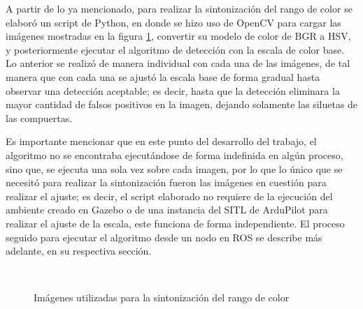 A partir de lo ya mencionado, para realizar la sintonización del rango de color se elaboró un script de Python, en donde se hizo uso de OpenCV para cargar las imágenes mostradas en la figura \ref{fig:cv_gates}, convertir su modelo de color de BGR a HSV, y posteriormente ejecutar el algoritmo de detección con la escala de color base. Lo anterior se realizó de manera individual con cada una de las imágenes, de tal manera que con cada una se ajustó la escala base de forma gradual hasta observar una detección aceptable; es decir, hasta que la detección eliminara la mayor cantidad de falsos positivos en la imagen, dejando solamente las siluetas de las compuertas. 

Es importante mencionar que en este punto del desarrollo del trabajo, el algoritmo no se encontraba ejecutándose de forma indefinida en algún proceso, sino que, se ejecuta una sola vez sobre cada imagen, por lo que lo único que se necesitó para realizar la sintonización fueron las imágenes en cuestión para realizar el ajuste; es decir, el script elaborado no requiere de la ejecución del ambiente creado en Gazebo o de una instancia del SITL de ArduPilot para realizar el ajuste de la escala, este funciona de forma independiente. El proceso seguido para ejecutar el algoritmo desde un nodo en ROS se describe más adelante, en su respectiva sección.


\begin{figure}[ht]
    \centering
    \hfill
    \\
    \hfill
    \hfill

    \caption{Imágenes utilizadas para la sintonización del rango de color}
    \label{fig:cv_gates}
\end{figure}

